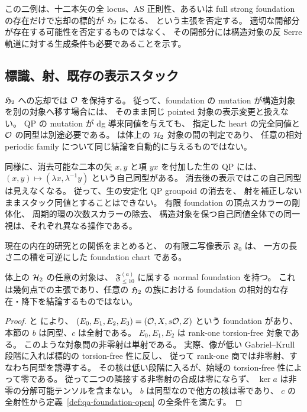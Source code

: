 この二例は、十二本矢の全 locus、AS 正則性、あるいは
full strong foundation の存在だけで忘却の標的が \(\mathfrak H_2\) になる、
という主張を否定する。
適切な開部分が存在する可能性を否定するものではなく、
その開部分には構造対象の反 Serre 軌道に対する生成条件も必要であることを示す。

\subsection{標識、射、既存の表示スタック}

\(\mathfrak H_2\) への忘却では \(\mathcal O\) を保持する。
従って、foundation の mutation が構造対象を別の対象へ移す場合には、
そのまま同じ pointed 対象の表示変更と扱えない。
QP の mutation が dg 導来同値を与えても、
指定した heart の完全同値と \(\mathcal O\) の同型は別途必要である。
\cite[\texttt{cor:pointed-derived-exact}]{QuadricIntrinsic2026} は体上の \(\mathcal H_2\) 対象の間の判定であり、
任意の相対 periodic family について同じ結論を自動的に与えるものではない。

同様に、消去可能な二本の矢 \(x,y\) と項 \(yx\) を付加した生の QP には、
\((x,y)\mapsto(\lambda x,\lambda^{-1}y)\) という自己同型がある。
消去後の表示ではこの自己同型は見えなくなる。
従って、生の安定化 QP groupoid の消去を、
射を補正しないままスタック同値とすることはできない。
有限 foundation の頂点スカラーの剛体化、
周期的環の次数スカラーの除去、
構造対象を保つ自己同値全体での同一視は、それぞれ異なる操作である。

現在の内在的研究との関係をまとめると、
\cite[\texttt{prop:foundation-stack}]{QuadricModuli2026} の有限二写像表示 \(\mathfrak F_0\) は、
一方の長さ二の積を可逆にした foundation chart である。

\begin{proposition}
\label{prop:qa-h2-normal-ten-chart}
体上の \(\mathcal H_2\) の任意の対象は、
\(\mathfrak F_{\le10}^{(a)}\) に属する normal foundation を持つ。
これは幾何点での主張であり、任意の \(\mathfrak H_2\) の族における
foundation の相対的な存在・降下を結論するものではない。
\end{proposition}
\begin{proof}
\cite[\texttt{thm:normal-helix}]{QuadricIntrinsic2026} と
\cite[\texttt{prop:ruling-involution-mutation}]{QuadricModuli2026} により、
\((E_0,E_1,E_2,E_3)=(\mathcal O,X,s\mathcal O,Z)\) という foundation があり、
本節の \(b\) は同型、\(c\) は全射である。
\(E_0,E_1,E_2\) は rank-one torsion-free 対象である。
このような対象間の非零射は単射である。
実際、像が低い Gabriel--Krull 段階に入れば標的の torsion-free 性に反し、
従って rank-one 商では非零射、すなわち同型を誘導する。
その核は低い段階に入るが、始域の torsion-free 性によって零である。
従って二つの隣接する非零射の合成は零にならず、
\(\ker a\) は非零の分解可能テンソルを含まない。
\(b\) は同型なので他方の核は零であり、
\(c\) の全射性から定義~\ref{def:qa-foundation-open} の全条件を満たす。
\end{proof}

